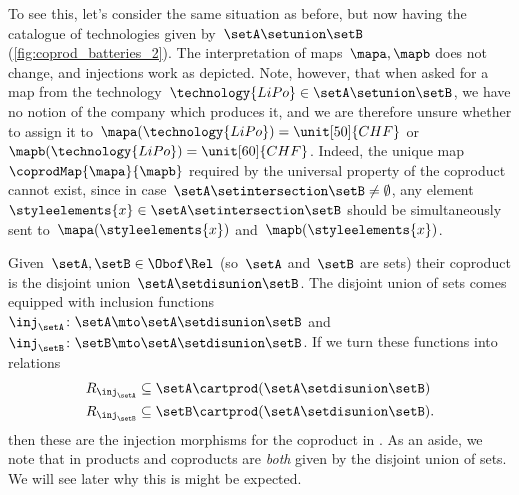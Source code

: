 \begin{example}
	To see this, let's consider the same situation as before, but now having the catalogue of technologies given by~$\setA\setunion \setB$ (\cref{fig:coprod_batteries_2}).
	The interpretation of maps~$\mapa,\mapb$ does not change, and injections work as depicted.
	Note, however, that when asked for a map from the technology~$\technology{LiPo}\in \setA\setunion \setB$, we have no notion of the company which produces it, and we are therefore unsure whether to assign it to~$\mapa(\technology{LiPo})=\unit[50]{CHF}$ or~$\mapb(\technology{LiPo})=\unit[60]{CHF}$.
	Indeed, the unique map~$\coprodMap{\mapa}{\mapb}$ required by the universal property of the coproduct cannot exist, since in case~$\setA\setintersection \setB\neq \emptyset$, any element~$\styleelements{x}\in \setA\setintersection \setB$ should be simultaneously sent to~$\mapa(\styleelements{x})$ and~$\mapb(\styleelements{x})$.

\end{example}


\begin{example}
	Given~$\setA,\setB\in \Obof\Rel$ (so~$\setA$ and~$\setB$ are sets) their coproduct is the disjoint union~$\setA \setdisunion \setB$.
	The disjoint union of sets comes equipped with inclusion functions~$\inj_\setA\colon \setA\mto \setA \setdisunion\setB$ and~$\inj_\setB\colon \setB\mto \setA \setdisunion\setB$.
	If we turn these functions into relations
	\begin{equation*}
		\begin{aligned}
			R_{\inj_\setA} & \subseteq \setA\cartprod (\setA \setdisunion\setB)  \\
			R_{\inj_\setB} & \subseteq \setB\cartprod (\setA \setdisunion\setB).
		\end{aligned}
	\end{equation*}
	then these are the injection morphisms for the coproduct in \Rel.
	As an aside, we note that in \Rel products and coproducts are \emph{both} given by the disjoint union of sets.
	We will see later why this is might be expected.
\end{example}


